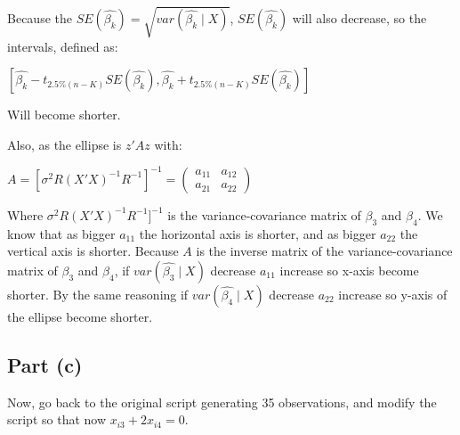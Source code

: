 \documentclass[12pt,a4paper]{article}
\begin{document}
\begin{enumerate}[label=(\roman*)]
Because the $SE(\hat{\beta_k}) = \sqrt{var(\hat{\beta_k}\mid X)}$, $SE(\hat{\beta_k})$ will also decrease, so the intervals, defined as:

\begin{center}
   $[\hat{\beta_k} - t_{2.5\%(n-K)} SE(\hat{\beta_k}), \hat{\beta_k} + t_{2.5\%(n-K)} SE(\hat{\beta_k})]$ 
\end{center}

Will become shorter.

Also, as the ellipse is $z'Az $ with:

\begin{center}
    $A = [\sigma^2R(X'X)^{-1}R^{-1}]^{-1} =
\begin{pmatrix}
a_{11} & a_{12}\\
a_{21} & a_{22}
\end{pmatrix}
$
\end{center}

Where $\sigma^2R(X'X)^{-1}R^{-1}]^{-1}$ is the variance-covariance matrix of $\beta_3$ and $\beta_4$. We know that as bigger $a_{11}$ the horizontal axis is shorter, and as bigger $a_{22}$ the vertical axis is shorter. Because $A$ is the inverse matrix of the variance-covariance matrix of $\beta_3$ and $\beta_4$, if $var(\hat{\beta_3}\mid X)$ decrease $a_{11}$ increase so x-axis become shorter. By the same reasoning if $var(\hat{\beta_4}\mid X)$ decrease $a_{22}$ increase so y-axis of the ellipse become shorter.

  
\end{enumerate}

\subsection*{Part (c)}
Now, go back to the original script generating 35 observations, and modify the script so that now $x_{i3} + 2x_{i4} = 0$.
\end{document}
